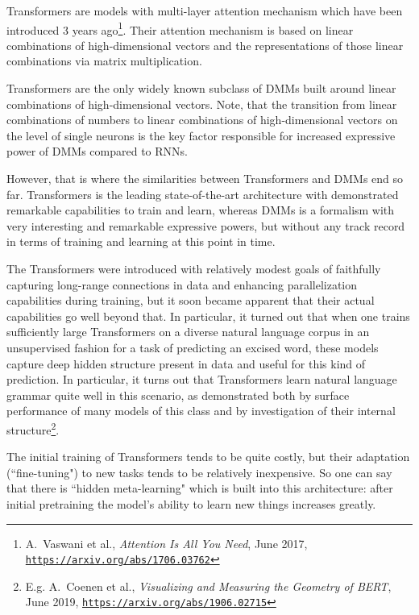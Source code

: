 \documentclass{article}
\begin{document}
Transformers are models with multi-layer attention mechanism which have been introduced 
3 years ago\footnote{A.~Vaswani et al., {\em Attention Is All You Need}, June 2017,
\href{https://arxiv.org/abs/1706.03762}{\tt https://arxiv.org/abs/1706.03762}}. Their
attention mechanism is based on linear combinations of high-dimensional
vectors and the representations of those linear combinations via matrix multiplication.

Transformers are the only widely known subclass of DMMs built around linear combinations of high-dimensional
vectors. Note, that the transition from linear combinations of numbers to linear combinations of high-dimensional vectors
on the level of single neurons is the key factor responsible for increased expressive power of
DMMs compared to RNNs.

However, that is where the similarities between Transformers and DMMs end so far. 
Transformers is the leading state-of-the-art architecture
with demonstrated remarkable capabilities to train and learn, whereas DMMs is a formalism with very interesting
and remarkable expressive powers, but without any track record in terms of training and learning at this
point in time.

The Transformers were introduced with relatively
modest goals of faithfully capturing long-range connections in data and enhancing parallelization capabilities
during training, but it soon became apparent that their actual capabilities go well beyond that. In particular,
it turned out that when one trains sufficiently large Transformers on a diverse natural language corpus
in an unsupervised fashion for a task of predicting an excised word, these models capture deep hidden structure present
in data and
useful for this kind of prediction. In particular, it turns out that Transformers learn natural language grammar quite
well in this scenario, as demonstrated both by surface performance of many models of this class and by
investigation of their internal structure\footnote{E.g. A.~Coenen et al., {\em Visualizing and Measuring the Geometry of BERT}, June 2019, \href{https://arxiv.org/abs/1906.02715}{\tt https://arxiv.org/abs/1906.02715}}.

The initial training of Transformers tends to be quite costly, but their adaptation (``fine-tuning") to new tasks
tends to be relatively inexpensive. So one can say that there is ``hidden meta-learning" which is built into
this architecture: after initial pretraining the model's ability to learn new things increases greatly.
\end{document}
